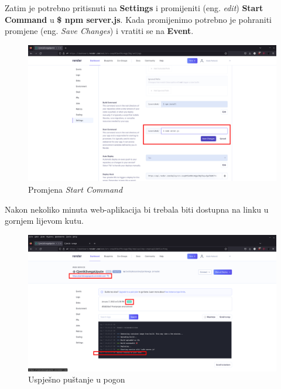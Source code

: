 			Zatim je potrebno pritisnuti na \textbf{Settings} i promijeniti (eng. \textit{edit}) \textbf{Start Command} u \textbf{\$ npm server.js}.
			Kada promijenimo potrebno je pohraniti promjene (eng. \textit{Save Changes}) i vratiti se na \textbf{Event}.
			\begin{figure}[H]
			\includegraphics[width=\textwidth]{slike/serverjs.png} %
			\caption{Promjena \textit{Start Command}}
			\label{fig:serverjs} %
			\end{figure}
			 Nakon nekoliko minuta web-aplikacija bi trebala biti dostupna na linku u gornjem lijevom kutu.
			 \begin{figure}[H]
			\includegraphics[width=\textwidth]{slike/deploy.png} %
			\caption{Uspješno puštanje u pogon}
			\label{fig:seeddb} %
			\end{figure}
			
			
			\eject 